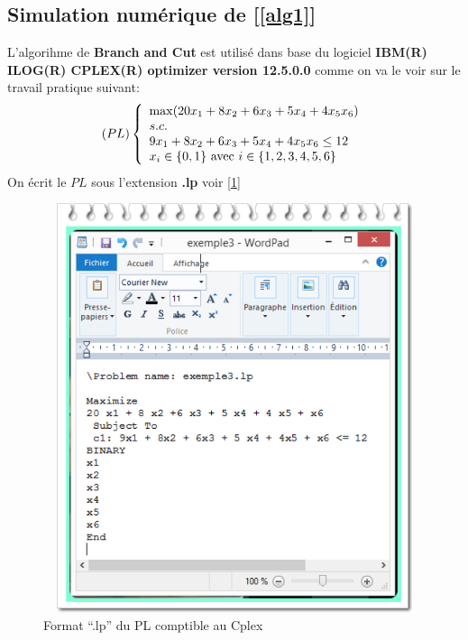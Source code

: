 \documentclass[a4paper,11pt,oneside]{report}
\theoremstyle{plain}
\newcommand{\0}{/ \! \! \! 0}
\theoremstyle{plain}
\begin{document}
\subsection*{Simulation num\'erique de [\ref{alg1}]}
L'algorihme de {\bf Branch and Cut} est utilis\'e dans base du logiciel {\bf IBM(R) ILOG(R) CPLEX(R) optimizer version 12.5.0.0}
comme on va le voir sur le travail pratique suivant:
\[
(PL) \left\{\begin{array}{l}
         \max ( 20x_1 + 8x_2 + 6x_3 + 5x_4 + 4x_5 x_6)\\
         s.c.  \\
         9x_1 + 8x_2 + 6x_3 + 5x_4 + 4x_5 x_6 \leq 12\\
         x_i \in \{0,1\}\,\, \textnormal{avec} \,\, i\in \{1,2,3,4,5,6\}
        \end{array}
 \right.
\]
On \'ecrit le $PL$ sous l'extension {\bf .lp } voir [\ref{fig2}]
  \begin{figure}[]
  \begin{center}
  \includegraphics[height=12cm,width=16cm]{formatlp}
  \caption{\label{fig2} Format ``.lp'' du PL comptible au Cplex}
  \end{center}
  \end{figure}
\end{document}
